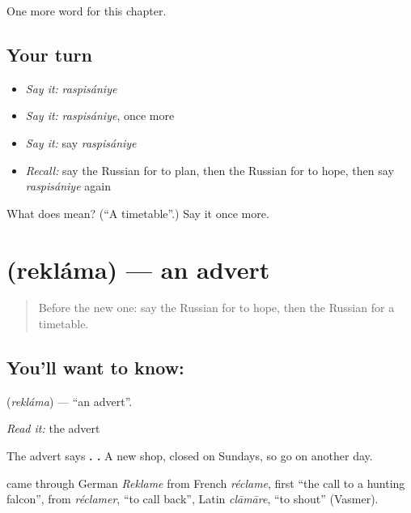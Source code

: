 \begin{grammarlens}[title={What you've built}]
One more word for this chapter.
\end{grammarlens}

\subsection*{Your turn}
\begin{itemize}
\raggedright
  \item \emph{Say it:} \emph{raspisániye}
  \item \emph{Say it:} \emph{raspisániye}, once more
  \item \emph{Say it:} say \emph{raspisániye}
  \item \emph{Recall:} say the Russian for to plan, then the Russian for to hope, then say \emph{raspisániye} again
\end{itemize}

\begin{tcolorbox}[breakable,colback=teal!4,colframe=teal!35!black,title={Before you move on}]
What does  mean? (\textquotedblleft{}A timetable\textquotedblright{}.) Say it once more.
\end{tcolorbox}
\section[\texorpdfstring{\ru{реклама} (rekláma)}{реклама (rekláma)}]{ (rekláma) — an advert}

\label{lesson:RU-C139-reklama}



\begin{quote}
Before the new one: say the Russian for to hope, then the Russian for a timetable.
\end{quote}

\subsection*{You'll want to know: }
\textbf{} (\emph{rekláma}) — \textquotedblleft{}an advert\textquotedblright{}.

\emph{Read it:} the advert

The advert says \textbf{ .   .} A new shop, closed on Sundays, so go on another day.

\begin{cousinweb}
\textbf{} came through German \emph{Reklame} from French \emph{réclame}, first \textquotedblleft{}the call to a hunting falcon\textquotedblright{}, from \emph{réclamer}, \textquotedblleft{}to call back\textquotedblright{}, Latin \emph{clāmāre}, \textquotedblleft{}to shout\textquotedblright{} (Vasmer).
\end{cousinweb}

